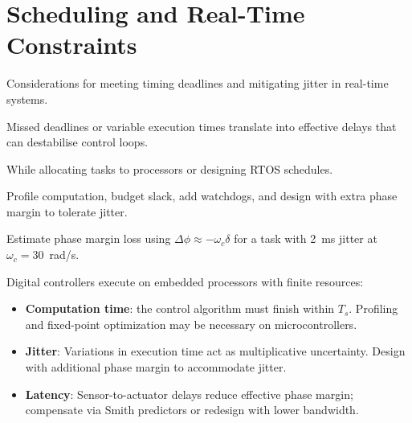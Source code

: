 \section{Scheduling and Real-Time Constraints}
\begin{beginnerguide}
    \item[\textbf{What?}] Considerations for meeting timing deadlines and mitigating jitter in real-time systems.
    \item[\textbf{Why?}] Missed deadlines or variable execution times translate into effective delays that can destabilise control loops.
    \item[\textbf{When?}] While allocating tasks to processors or designing RTOS schedules.
    \item[\textbf{How?}] Profile computation, budget slack, add watchdogs, and design with extra phase margin to tolerate jitter.
    \item[\textbf{Example}] Estimate phase margin loss using $\Delta\phi \approx -\omega_c \delta$ for a task with \SI{2}{ms} jitter at $\omega_c=30$~rad/s.
\end{beginnerguide}
Digital controllers execute on embedded processors with finite resources:
\begin{itemize}[leftmargin=*]
    \item \textbf{Computation time}: the control algorithm must finish within $T_s$. Profiling and fixed-point optimization may be necessary on microcontrollers.
    \item \textbf{Jitter}: Variations in execution time act as multiplicative uncertainty. Design with additional phase margin to accommodate jitter.
    \item \textbf{Latency}: Sensor-to-actuator delays reduce effective phase margin; compensate via Smith predictors or redesign with lower bandwidth.
\end{itemize}

